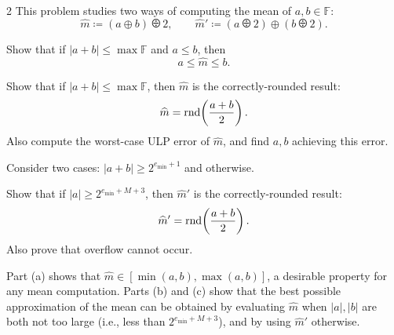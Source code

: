 \documentclass[11pt,oneside]{article}
\begin{document}
\begin{problem}{2}
This problem studies two ways of computing the mean of $a, b\in\mathbb F$:
\[
 \widehat m\coloneqq(a\oplus b)\odiv2,
 \qquad \widehat m'\coloneqq(a\odiv2)\oplus(b\odiv2).
\]
\begin{problemsubparts}
\item Show that if $|a+b|\le\max\mathbb F$ and $a\le b$, then
\[
 a\le\widehat m\le b.
\]
\item Show that if $|a+b|\le\max\mathbb F$, then $\widehat m$ is
the correctly-rounded result:
\[
 \widehat m=\operatorname{rnd}\!\left(\frac{a+b}{2}\right).
\]
Also compute the worst-case ULP error of $\widehat m$, and find
$a, b$ achieving this error.
\begin{hint}
Consider two cases: $|a+b|\ge2^{e_{\min}+1}$ and otherwise.
\end{hint}
\item Show that if $|a|\ge2^{e_{\min}+M+3}$, then $\widehat m'$
is the correctly-rounded result:
\[
 \widehat m'=\operatorname{rnd}\!\left(\frac{a+b}{2}\right).
\]
Also prove that overflow cannot occur.
\end{problemsubparts}
\begin{remark}
Part (a) shows that $\widehat m\in[\min(a, b), \max(a, b)]$,
a desirable property for any mean computation. Parts (b) and (c)
show that the best possible approximation of the mean can be obtained
by evaluating $\widehat m$ when $|a|, |b|$ are both not too large
(i.e., less than $2^{e_{\min}+M+3}$), and by using $\widehat m'$
otherwise.
\end{remark}
\end{problem}
\end{document}
